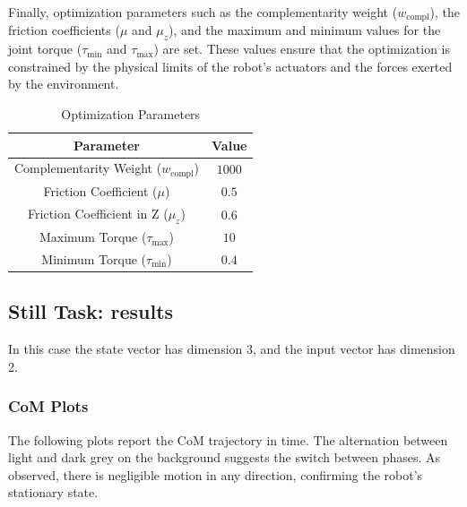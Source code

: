 \documentclass[main.tex]{subfiles}
\begin{document}
Finally, optimization parameters such as the complementarity weight (\(w_{\text{compl}}\)), the friction coefficients (\(\mu\) and \(\mu_z\)), and the maximum and minimum values for the joint torque (\(\tau_{\text{min}}\) and \(\tau_{\text{max}}\)) are set. These values ensure that the optimization is constrained by the physical limits of the robot’s actuators and the forces exerted by the environment.

\begin{table}[htbp]
\centering
\renewcommand{\arraystretch}{1.5} %
\begin{tabular}{|c|c|}
\hline
\textbf{Parameter} & \textbf{Value} \\ \hline
Complementarity Weight (\(w_{\text{compl}}\)) & \(1000\) \\ \hline
Friction Coefficient (\(\mu\)) & \(0.5\) \\ \hline
Friction Coefficient in Z (\(\mu_z\)) & \(0.6\) \\ \hline
Maximum Torque (\(\tau_{\text{max}}\)) & \(10\) \\ \hline
Minimum Torque (\(\tau_{\text{min}}\)) & \(0.4\) \\ \hline
\end{tabular}
\caption{Optimization Parameters}
\label{tab:optimization_params}
\end{table}


\subsection{Still Task: results}
In this case the state vector has dimension 3, and the input vector has dimension 2.
\subsubsection*{CoM Plots}
The following plots report the CoM trajectory in time. 
The alternation between light and dark grey on the background suggests the switch between phases.
As observed, there is negligible motion in any direction, confirming the robot's stationary state.
\end{document}
